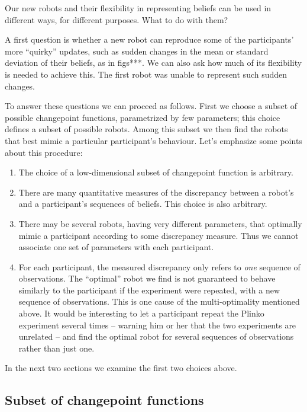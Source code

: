 \documentclass[\ifafour a4paper,12pt,\else a5paper,10pt,\fi%
onecolumn,oneside,article,%
british%
]{memoir}
\theoremstyle{remark}
\theoremstyle{innote}
\renewcommand*{\|}{\mathpunct{|}}
\newcommand*{\figs}{figs}%
\begin{document}
Our new robots and their flexibility in representing beliefs can be used in
different ways, for different purposes. What to do with them?

A first question is whether a new robot can reproduce some of the
participants' more \enquote{quirky} updates, such as sudden changes in the
mean or standard deviation of their beliefs, as in \figs***. We can also
ask how much of its flexibility is needed to achieve this. The first robot
was unable to represent such sudden changes.

To answer these questions we can proceed as follows. First we choose a
subset of possible changepoint functions, parametrized by few parameters;
this choice defines a subset of possible robots. Among this subset we then
find the robots that best mimic a particular participant's behaviour. Let's
emphasize some points about this procedure:
\begin{enumerate}
\item The choice of a low-dimensional subset of changepoint function is
   arbitrary.
 \item There are many quantitative measures of the discrepancy between a
   robot's and a participant's sequences of beliefs. This choice is also
   arbitrary.
 \item There may be several robots, having very different parameters, that
   optimally mimic a participant according to some discrepancy measure.
   Thus we cannot associate one set of parameters with each participant.
 \item For each participant, the measured discrepancy only refers to
   \emph{one} sequence of observations. The \enquote{optimal} robot we find
   is not guaranteed to behave similarly to the participant if the
   experiment were repeated, with a new sequence of observations. This is
   one cause of the multi-optimality mentioned above. It would be
   interesting to let a participant repeat the Plinko experiment several
   times -- warning him or her that the two experiments are unrelated --
   and find the optimal robot for several sequences of observations rather
   than just one.
 \end{enumerate}

 In the next two sections we examine the first two choices above.

 \subsection{Subset of changepoint functions}
\label{sec:restrictions_h}
\end{document}
